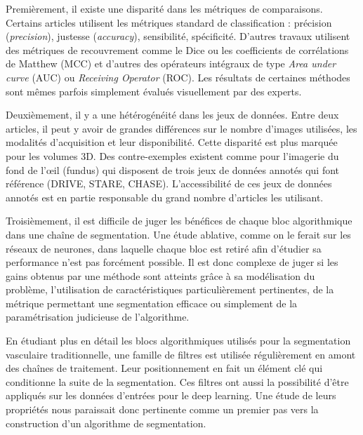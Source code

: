     Premièrement, il existe une disparité dans les métriques de comparaisons. Certains articles utilisent les métriques standard de classification : précision (\textit{precision}), justesse (\textit{accuracy}), sensibilité, spécificité. D'autres travaux utilisent des métriques de recouvrement comme le Dice ou les coefficients de corrélations de Matthew (MCC) et d'autres des opérateurs intégraux de type \textit{Area under curve} (AUC) ou \textit{Receiving Operator} (ROC). Les résultats de certaines méthodes sont mêmes parfois simplement évalués visuellement par des experts.

    Deuxièmement, il y a une hétérogénéité dans les jeux de données. Entre deux articles, il peut y avoir de grandes différences sur le nombre d'images utilisées, les modalités d'acquisition et leur disponibilité. Cette disparité est plus marquée pour les volumes 3D. Des contre-exemples existent comme pour l'imagerie du fond de l'œil (fundus) qui disposent de trois jeux de données annotés qui font référence (DRIVE, STARE, CHASE). L'accessibilité de ces jeux de données annotés est en partie responsable du grand nombre d'articles les utilisant.

    Troisièmement, il est difficile de juger les bénéfices de chaque bloc algorithmique dans une chaîne de segmentation. Une étude ablative, comme on le ferait sur les réseaux de neurones, dans laquelle chaque bloc est retiré afin d'étudier sa performance n'est pas forcément possible. Il est donc complexe de juger si les gains obtenus par une méthode sont atteints grâce à sa modélisation du problème, l'utilisation de caractéristiques particulièrement pertinentes, de la métrique permettant une segmentation efficace ou simplement de la paramétrisation judicieuse de l'algorithme.

    En étudiant plus en détail les blocs algorithmiques utilisés pour la segmentation vasculaire traditionnelle, une famille de filtres est utilisée régulièrement en amont des chaînes de traitement. Leur positionnement en fait un élément clé qui conditionne la suite de la segmentation. Ces filtres ont aussi la possibilité d'être appliqués sur les données d'entrées pour le deep learning. Une étude de leurs propriétés nous paraissait donc pertinente comme un premier pas vers la construction d'un algorithme de segmentation.




